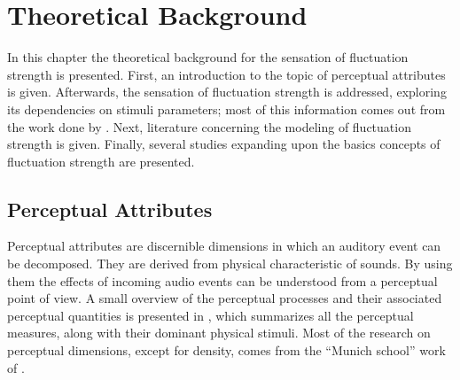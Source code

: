 \documentclass[../main.tex]{subfiles}
\begin{document}
\chapter{Theoretical Background}
\label{cha:theoretical}

In this chapter the theoretical background for the sensation of fluctuation
strength is presented. First, an introduction to the topic of perceptual
attributes is given. Afterwards, the sensation of fluctuation strength is
addressed, exploring its dependencies on stimuli parameters; most of this
information comes out from the work done by \textcite{Fastl2007Psychoacoustics}.
Next, literature concerning the modeling of fluctuation strength is given.
Finally, several studies expanding upon the basics concepts of fluctuation
strength  are presented.

\begin{theoreticalbackground}

\section{Perceptual Attributes}

Perceptual attributes are discernible dimensions in which an auditory event can
be decomposed. They are derived from physical characteristic of sounds. By using
them the effects of incoming audio events can be understood from a perceptual
point of view. A small overview of the perceptual processes and their associated
perceptual quantities is presented in , which summarizes all
the perceptual measures, along with their dominant physical stimuli. Most of the
research on perceptual dimensions, except for density, comes from the
``Munich school'' work of \textcite{Fastl2007Psychoacoustics}.


\end{theoreticalbackground}
\end{document}
